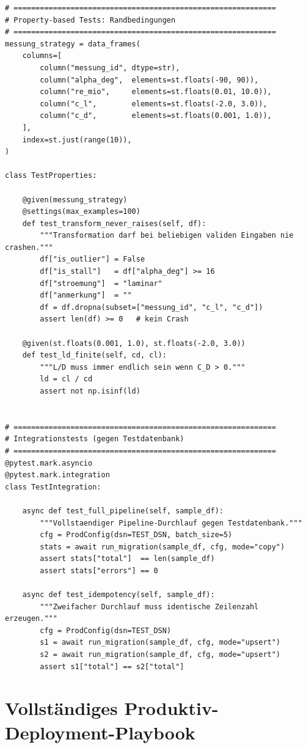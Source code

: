 ﻿\documentclass[12pt,a4paper]{report}
\theoremstyle{definition}
\theoremstyle{remark}
\begin{document}
\begin{lstlisting}[style=python, caption={test\_etl.py: Vollständige Testsuite mit pytest und hypothesis}]
# ============================================================
# Property-based Tests: Randbedingungen
# ============================================================
messung_strategy = data_frames(
    columns=[
        column("messung_id", dtype=str),
        column("alpha_deg",  elements=st.floats(-90, 90)),
        column("re_mio",     elements=st.floats(0.01, 10.0)),
        column("c_l",        elements=st.floats(-2.0, 3.0)),
        column("c_d",        elements=st.floats(0.001, 1.0)),
    ],
    index=st.just(range(10)),
)

class TestProperties:

    @given(messung_strategy)
    @settings(max_examples=100)
    def test_transform_never_raises(self, df):
        """Transformation darf bei beliebigen validen Eingaben nie crashen."""
        df["is_outlier"] = False
        df["is_stall"]   = df["alpha_deg"] >= 16
        df["stroemung"]  = "laminar"
        df["anmerkung"]  = ""
        df = df.dropna(subset=["messung_id", "c_l", "c_d"])
        assert len(df) >= 0   # kein Crash

    @given(st.floats(0.001, 1.0), st.floats(-2.0, 3.0))
    def test_ld_finite(self, cd, cl):
        """L/D muss immer endlich sein wenn C_D > 0."""
        ld = cl / cd
        assert not np.isinf(ld)


# ============================================================
# Integrationstests (gegen Testdatenbank)
# ============================================================
@pytest.mark.asyncio
@pytest.mark.integration
class TestIntegration:

    async def test_full_pipeline(self, sample_df):
        """Vollstaendiger Pipeline-Durchlauf gegen Testdatenbank."""
        cfg = ProdConfig(dsn=TEST_DSN, batch_size=5)
        stats = await run_migration(sample_df, cfg, mode="copy")
        assert stats["total"]  == len(sample_df)
        assert stats["errors"] == 0

    async def test_idempotency(self, sample_df):
        """Zweifacher Durchlauf muss identische Zeilenzahl erzeugen."""
        cfg = ProdConfig(dsn=TEST_DSN)
        s1 = await run_migration(sample_df, cfg, mode="upsert")
        s2 = await run_migration(sample_df, cfg, mode="upsert")
        assert s1["total"] == s2["total"]
\end{lstlisting}

\chapter{Vollständiges Produktiv-Deployment-Playbook}
\label{sec:playbook}
\end{document}
